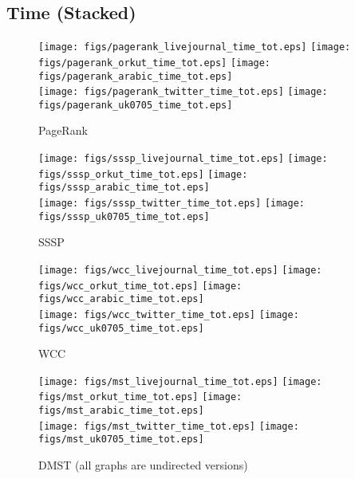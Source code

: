 \documentclass{article}
\newcommand{\bline}[1][1]{\vspace{#1\baselineskip}}
\begin{document}
\pagebreak
\subsection{Time (Stacked)}
\begin{figure}[!h]
  \bline[1]
  \centering
  \texttt{[image: figs/pagerank\_livejournal\_time\_tot.eps]}\hspace{1em}%
  \texttt{[image: figs/pagerank\_orkut\_time\_tot.eps]}\hspace{1em}%
  \texttt{[image: figs/pagerank\_arabic\_time\_tot.eps]}\\
  \texttt{[image: figs/pagerank\_twitter\_time\_tot.eps]}\hspace{1em}%
  \texttt{[image: figs/pagerank\_uk0705\_time\_tot.eps]}
  \caption{PageRank}
\end{figure}

\begin{figure}[!h]
  \bline[3.5]
  \centering
  \texttt{[image: figs/sssp\_livejournal\_time\_tot.eps]}\hspace{1em}%
  \texttt{[image: figs/sssp\_orkut\_time\_tot.eps]}\hspace{1em}%
  \texttt{[image: figs/sssp\_arabic\_time\_tot.eps]}\\
  \texttt{[image: figs/sssp\_twitter\_time\_tot.eps]}\hspace{1em}%
  \texttt{[image: figs/sssp\_uk0705\_time\_tot.eps]}
  \caption{SSSP}
\end{figure}

\begin{figure}[!h]
  \bline[3.5]
  \centering
  \texttt{[image: figs/wcc\_livejournal\_time\_tot.eps]}\hspace{1em}%
  \texttt{[image: figs/wcc\_orkut\_time\_tot.eps]}\hspace{1em}%
  \texttt{[image: figs/wcc\_arabic\_time\_tot.eps]}\\
  \texttt{[image: figs/wcc\_twitter\_time\_tot.eps]}\hspace{1em}%
  \texttt{[image: figs/wcc\_uk0705\_time\_tot.eps]}
  \caption{WCC}
\end{figure}

\begin{figure}[!h]
  \bline[3.5]
  \centering
  \texttt{[image: figs/mst\_livejournal\_time\_tot.eps]}\hspace{1em}%
  \texttt{[image: figs/mst\_orkut\_time\_tot.eps]}\hspace{1em}%
  \texttt{[image: figs/mst\_arabic\_time\_tot.eps]}\\
  \texttt{[image: figs/mst\_twitter\_time\_tot.eps]}\hspace{1em}%
  \texttt{[image: figs/mst\_uk0705\_time\_tot.eps]}
  \caption{DMST (all graphs are undirected versions)}
\end{figure}
\end{document}
